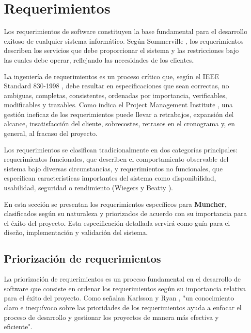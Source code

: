 \section*{Requerimientos}

Los requerimientos de software constituyen la base fundamental para el desarrollo exitoso de cualquier sistema informático. Según Sommerville \cite{Sommerville2010}, los requerimientos describen los servicios que debe proporcionar el sistema y las restricciones bajo las cuales debe operar, reflejando las necesidades de los clientes.

La ingeniería de requerimientos es un proceso crítico que, según el IEEE Standard 830-1998 \cite{IEEE830-1998}, debe resultar en especificaciones que sean correctas, no ambiguas, completas, consistentes, ordenadas por importancia, verificables, modificables y trazables. Como indica el Project Management Institute \cite{PMI2021}, una gestión ineficaz de los requerimientos puede llevar a retrabajos, expansión del alcance, insatisfacción del cliente, sobrecostes, retrasos en el cronograma y, en general, al fracaso del proyecto.

Los requerimientos se clasifican tradicionalmente en dos categorías principales: requerimientos funcionales, que describen el comportamiento observable del sistema bajo diversas circunstancias, y requerimientos no funcionales, que especifican características importantes del sistema como disponibilidad, usabilidad, seguridad o rendimiento (Wiegers y Beatty \cite{Wiegers2013}).

En esta sección se presentan los requerimientos específicos para \textbf{Muncher}, clasificados según su naturaleza y priorizados de acuerdo con su importancia para el éxito del proyecto. Esta especificación detallada servirá como guía para el diseño, implementación y validación del sistema.

\subsection*{Priorización de requerimientos}

La priorización de requerimientos es un proceso fundamental en el desarrollo de software que consiste en ordenar los requerimientos según su importancia relativa para el éxito del proyecto. Como señalan Karlsson y Ryan \cite{Karlsson1997}, "un conocimiento claro e inequívoco sobre las prioridades de los requerimientos ayuda a enfocar el proceso de desarrollo y gestionar los proyectos de manera más efectiva y eficiente".

